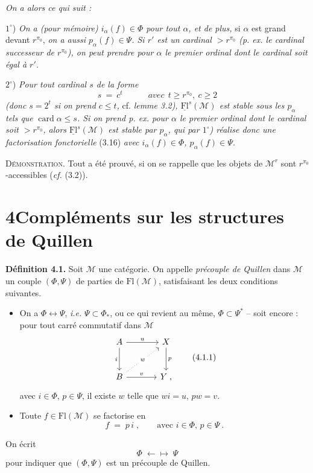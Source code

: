 \documentclass[11pt]{article}
\newcommand{\printedpage}[1]{\marginpar{\footnotesize p.~#1}}
\newcommand{\msp}[1]{\marginpar{\footnotesize [#1]}}
\newcommand{\M}{\mathcal{M}}
\newcommand{\Fl}{\mathrm{Fl}}
\newcommand{\uFl}{\underline{\mathrm{Fl}}}
\newcommand{\card}{\operatorname{card}}
\newcommand{\qpre}{\mathrel{\leftarrow\!\!\!\!\mapsto}}
\begin{document}
\textit{On a alors ce qui suit :}

$1^\circ$) \textit{On a (pour mémoire) $i_\alpha(f)\in\Phi$ pour tout $\alpha$, et de plus,} si $\alpha$ est grand devant $r^{\pi_0}$, \textit{on a aussi $p_\alpha(f)\in\Psi$. Si $r'$ est un cardinal $>r^{\pi_0}$ (p. ex. le cardinal successeur de $r^{\pi_0}$), on peut prendre pour $\alpha$ le premier ordinal dont le cardinal soit égal à $r'$.}

$2^\circ$) \textit{Pour tout cardinal $s$ de la forme}
\[
s\ =\ c^t\qquad\quad\textit{avec}\ \ t\geq r^{\pi_0},\ c\geq 2
\]
\textit{(donc $s=2^t$ si on prend $c\leq t$,} cf. \textit{lemme 3.2), $\uFl^s(\M)$ est stable sous les $p_\alpha$ tels que} $\card\alpha\leq s$\textit{. Si on prend p. ex. pour $\alpha$ le premier ordinal dont le cardinal soit $>r^{\pi_0}$, alors $\uFl^s(\M)$ est stable par $p_\alpha$, qui par $1^\circ$) réalise donc une factorisation fonctorielle} \textup{(3.16)} \textit{avec $i_\alpha(f)\in\Phi$, $p_\alpha(f)\in\Psi$.}

\printedpage{19}

\msp{page 28}
\textsc{Démonstration}. Tout a été prouvé, si on se rappelle que les objets de $\mathcal{M}^r$ sont $r^{\pi_0}$-accessibles (\textit{cf.} (3.2)).

\section*{4\quad Compléments sur les structures de Quillen}

\textbf{Définition 4.1.} Soit $\mathcal{M}$ une catégorie. On appelle \textit{précouple de Quillen} dans $\mathcal{M}$ un couple $(\Phi,\Psi)$ de parties de $\Fl(\mathcal{M})$, satisfaisant les deux conditions suivantes.
\begin{itemize}[leftmargin=2.5em]
\item[\textit{a})] On a $\Phi\longleftrightarrow\Psi$, \textit{i.e.} $\Psi\subset\Phi_*$, ou ce qui revient au même, $\Phi\subset\Psi^*$ -- soit encore : pour tout carré commutatif dans $\mathcal{M}$
\[
\begin{tikzcd}[row sep=large, column sep=large]
A \arrow[r, "u"] \arrow[d, "i"'] & X \arrow[d, "p"] \\
B \arrow[ur, dotted, "w" description] \arrow[r, "v"] & Y \;,
\end{tikzcd}
\tag*{(4.1.1)}
\]
avec $i\in\Phi$, $p\in\Psi$, il existe $w$ telle que $wi=u$, $pw=v$.
\item[\textit{b})] Toute $f\in\Fl(\mathcal{M})$ se factorise en
\[
f \;=\; p\,i\;, \qquad \text{avec } i\in\Phi,\, p\in\Psi\ .
\]
\end{itemize}
On écrit
\[
\Phi \;\qpre\; \Psi
\tag*{(4.1.2)}
\] %
pour indiquer que $(\Phi,\Psi)$ est un précouple de Quillen.
\end{document}

